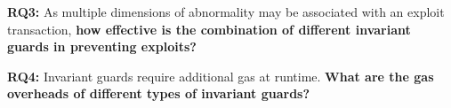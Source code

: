 \textbf{RQ3: } As multiple dimensions of abnormality may be associated with an
exploit transaction, \textbf{how effective is the combination of different
invariant guards in preventing exploits?}

\textbf{RQ4: } Invariant guards require additional gas at runtime. \textbf{What
are the gas overheads of different types of invariant guards?}











